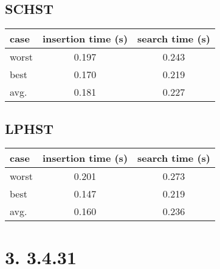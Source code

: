 \documentclass{article}
\begin{document}
\subsection*{SCHST}
\begin{tabular}{|l|c|c|}
    \hline
    case&insertion time (s)&search time (s)\\
    \hline
    worst&0.197&0.243\\
    \hline
    best&0.170&0.219\\
    \hline
    avg.&0.181&0.227\\
    \hline
\end{tabular}

\subsection*{LPHST}
\begin{tabular}{|l|c|c|}
    \hline
    case&insertion time (s)&search time (s)\\
    \hline
    worst&0.201&0.273\\
    \hline
    best&0.147&0.219\\
    \hline
    avg.&0.160&0.236\\
    \hline
\end{tabular}

\section*{3. 3.4.31}
\end{document}
